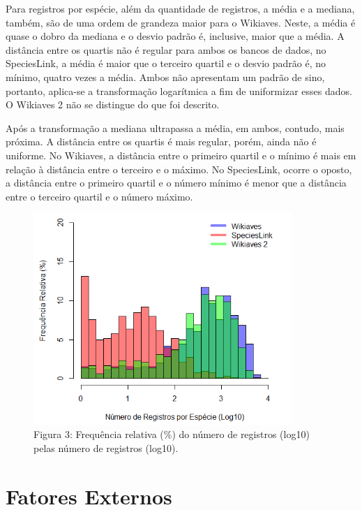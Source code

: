\documentclass[12pt]{extarticle}
\newenvironment{resposta}{ \color{mygray}}{}
\begin{document}
\begin{resposta}
Para registros por espécie, além da quantidade de registros, a média e a mediana, também, são de uma ordem de grandeza maior para o Wikiaves. Neste, a média é quase o dobro da mediana e o desvio padrão é, inclusive, maior que a média. A distância entre os quartis não é regular para ambos os bancos de dados, no SpeciesLink, a média é maior que o terceiro quartil e o desvio padrão é, no mínimo, quatro vezes a média. Ambos não apresentam um padrão de sino, portanto, aplica-se a transformação logarítmica a fim de uniformizar esses dados. O Wikiaves 2 não se distingue do que foi descrito.

Após a transformação a mediana ultrapassa a média, em ambos, contudo, mais próxima. A distância entre os quartis é mais regular, porém, ainda não é uniforme. No Wikiaves, a distância entre o primeiro quartil e o mínimo é mais em relação à distância entre o terceiro e o máximo. No SpeciesLink, ocorre o oposto, a distância entre o primeiro quartil e o número mínimo é menor que a distância entre o terceiro quartil e o número máximo.
 
\end{resposta}

\begin{figure}[h!]
\centering
\includegraphics[height = 8cm]{Imagens/H03.png}
\\{\scriptsize Figura 3: Frequência relativa (\%) do número de registros (log10) pelas número de registros (log10).}
\end{figure}

\newpage

\section{Fatores Externos}
\end{document}
